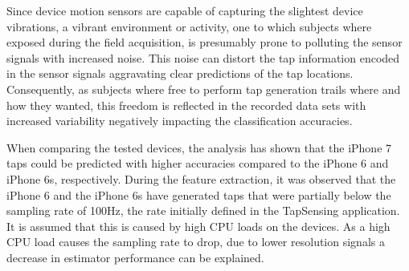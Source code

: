 
Since device motion sensors are capable of capturing the slightest device vibrations, a vibrant environment or activity, one to which subjects where exposed during the field acquisition, is presumably prone to polluting the sensor signals with increased noise. This noise can distort the tap information encoded in the sensor signals aggravating clear predictions of the tap locations. Consequently, as subjects where free to perform tap generation trails where and how they wanted, this freedom is reflected in the recorded data sets with increased variability negatively impacting the classification accuracies.

When comparing the tested devices, the analysis has shown that the iPhone 7 taps could be predicted with higher accuracies compared to the iPhone 6 and iPhone 6s, respectively. During the feature extraction, it was observed that the iPhone 6 and the iPhone 6s have generated taps that were partially below the sampling rate of 100Hz, the rate initially defined in the TapSensing application. It is assumed that this is caused by high CPU loads on the devices. As a high CPU load causes the sampling rate to drop, due to lower resolution signals a decrease in estimator performance can be explained.

